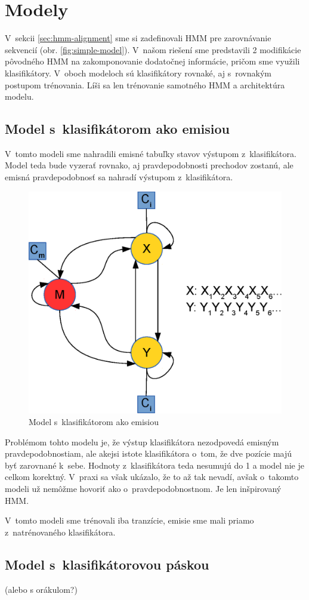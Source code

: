 \chapter{Modely}

V~sekcii \ref{sec:hmm-alignment} sme si zadefinovali HMM pre zarovnávanie sekvencií (obr. \ref{fig:simple-model}).
V~našom riešení sme predstavili 2 modifikácie pôvodného HMM na zakomponovanie dodatočnej informácie, pričom sme využili klasifikátory. V~oboch modeloch sú klasifikátory rovnaké, aj s~rovnakým postupom trénovania. Líši sa len trénovanie samotného HMM a architektúra modelu.

\section{Model s~klasifikátorom ako emisiou}

V~tomto modeli sme nahradili emisné tabuľky stavov výstupom z~klasifikátora.
Model teda bude vyzerať rovnako, aj pravdepodobnosti prechodov zostanú, ale emisná pravdepodobnosť sa nahradí výstupom z~klasifikátora.

\begin{figure}[htp]
    \centering
    \includegraphics[width=.5\textwidth]{images/model_clf}
    \caption{Model s~klasifikátorom ako emisiou}
\end{figure}


Problémom tohto modelu je, že výstup klasifikátora nezodpovedá emisným pravdepodobnostiam, ale akejsi istote klasifikátora o~tom, že dve pozície majú byť zarovnané k~sebe. Hodnoty z~klasifikátora teda nesumujú do 1 a model nie je celkom korektný. V~praxi sa však ukázalo, že to až tak nevadí, avšak o~takomto modeli už nemôžme hovoriť ako o~pravdepodobnostnom. Je len inšpirovaný HMM.

V~tomto modeli sme trénovali iba tranzície, emisie sme mali priamo z~natrénovaného klasifikátora.

\section{Model s~klasifikátorovou páskou}
(\todo alebo s orákulom?)

